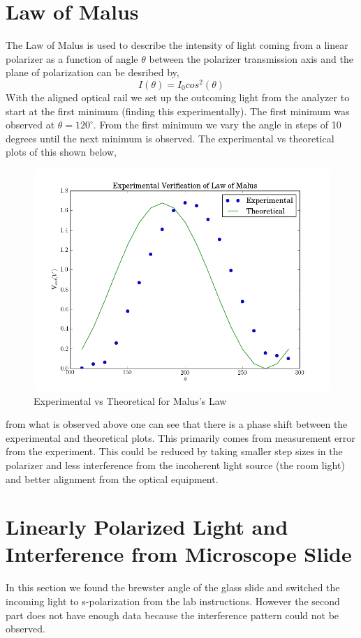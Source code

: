 \documentclass[paper=a4, fontsize=11pt]{scrartcl} %
\numberwithin{equation}{section}
\numberwithin{figure}{section}
\numberwithin{table}{section}
\begin{document}
\section{Law of Malus}
The Law of Malus is used to describe the intensity of light coming from a linear polarizer as a function of angle $\theta$ between the polarizer transmission axis and the plane of polarization can be desribed by,
\begin{equation}
I(\theta) = I_0cos^2(\theta)
\end{equation}
With the aligned optical rail we set up the outcoming light from the analyzer to start at the first minimum (finding this experimentally). The first minimum was observed at $\theta = 120 ^{\circ}$. From the first minimum we vary the angle in steps of 10 degrees until the next minimum is observed. The experimental vs theoretical plots of this shown below,
\begin{figure}[H]
\centering
\includegraphics[scale =0.4]{malus}
\caption{Experimental vs Theoretical for Malus's Law}
\end{figure}
from what is observed above one can see that there is a phase shift between the experimental and theoretical plots. This primarily comes from measurement error from the experiment. This could be reduced by taking smaller step sizes in the polarizer and less interference from the incoherent light source (the room light) and better alignment from the optical equipment. 
\section{Linearly Polarized Light and Interference from Microscope Slide}
In this section we found the brewster angle of the glass slide and switched the incoming light to s-polarization from the lab instructions. However the second part does not have enough data because the interference pattern could not be observed.
\end{document}
